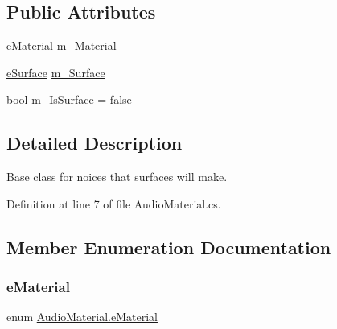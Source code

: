 \subsection*{Public Attributes}
\begin{DoxyCompactItemize}
\item 
\mbox{\hyperlink{class_audio_material_a151b037a36c4d5e527fde55fce102fbf}{e\+Material}} \mbox{\hyperlink{class_audio_material_a245b98ddac6d14ca2210425801a79f09}{m\+\_\+\+Material}}
\item 
\mbox{\hyperlink{class_audio_material_a0eaec8dca6445f5aa32e1146666cfe49}{e\+Surface}} \mbox{\hyperlink{class_audio_material_a8dc4e2653bf8b1bcc91f5bfd13eb2987}{m\+\_\+\+Surface}}
\item 
bool \mbox{\hyperlink{class_audio_material_a07c7ec983111d598e3f5dfcdcfea57e8}{m\+\_\+\+Is\+Surface}} = false
\end{DoxyCompactItemize}


\subsection{Detailed Description}
Base class for noice\textquotesingle{}s that surfaces will make. 



Definition at line 7 of file Audio\+Material.\+cs.



\subsection{Member Enumeration Documentation}
\mbox{\label{class_audio_material_a151b037a36c4d5e527fde55fce102fbf}} 
\subsubsection{\texorpdfstring{e\+Material}{eMaterial}}
{\footnotesize\ttfamily enum \mbox{\hyperlink{class_audio_material_a151b037a36c4d5e527fde55fce102fbf}{Audio\+Material.\+e\+Material}}\hspace{0.3cm}{\ttfamily [strong]}}

